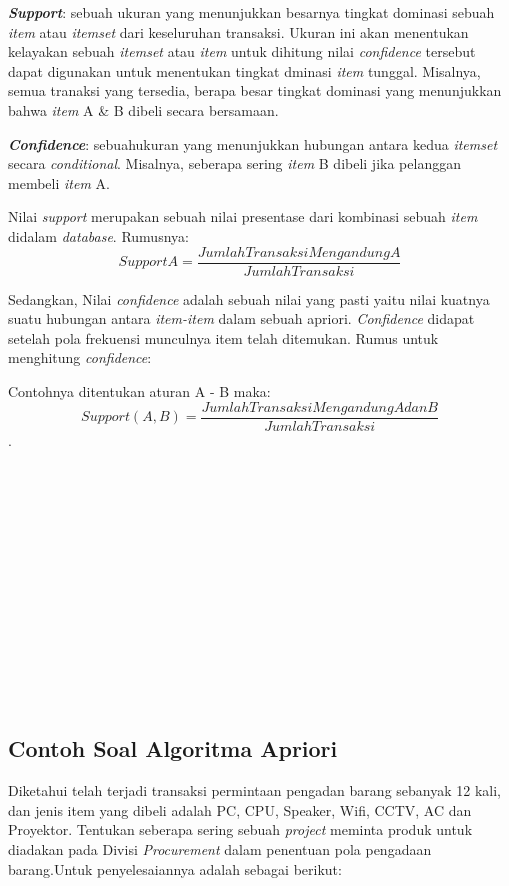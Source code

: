 \par 
\textbf{\textit{Support}}: sebuah ukuran yang menunjukkan besarnya tingkat dominasi sebuah \textit{item} atau \textit{itemset} dari keseluruhan transaksi. Ukuran ini akan menentukan kelayakan sebuah \textit{itemset} atau \textit{item} untuk dihitung nilai \textit{confidence} tersebut dapat digunakan untuk menentukan tingkat dminasi \textit{item} tunggal. Misalnya, semua tranaksi yang tersedia, berapa besar tingkat dominasi yang menunjukkan bahwa \textit{item} A \& B dibeli secara bersamaan.
\par
\textbf{\textit{Confidence}}: sebuahukuran yang menunjukkan hubungan antara kedua \textit{itemset} secara \textit{conditional}. Misalnya, seberapa sering \textit{item} B dibeli jika pelanggan membeli \textit{item} A.

\par
Nilai \textit{support} merupakan sebuah nilai presentase dari kombinasi sebuah \textit{item} didalam \textit{database}.
Rumusnya:
\begin{equation}
    Support A =\frac{Jumlah Transaksi Mengandung A}{Jumlah Transaksi} 
\end{equation}
\par
Sedangkan, Nilai \textit{confidence} adalah sebuah nilai yang pasti yaitu nilai kuatnya suatu hubungan antara \textit{item-item} dalam sebuah apriori. \textit{Confidence} didapat setelah pola frekuensi munculnya item telah ditemukan. Rumus untuk menghitung \textit{confidence}:
\par
Contohnya ditentukan aturan A - B maka:
 \begin{equation}
    Support (A,B) =\frac{Jumlah Transaksi Mengandung A dan B}{Jumlah Transaksi} 
\end{equation}
.
\\
\\
\\
\\
\\
\\
\\
\\
\\
\\
\\
\\
\\
\\
\subsection{Contoh Soal Algoritma Apriori}
Diketahui telah terjadi transaksi permintaan pengadan barang sebanyak 12 kali, dan jenis item yang dibeli adalah PC, CPU, Speaker, Wifi, CCTV, AC dan Proyektor. Tentukan seberapa sering sebuah \textit{project} meminta produk untuk diadakan pada Divisi \textit{Procurement} dalam penentuan pola pengadaan barang.Untuk penyelesaiannya adalah sebagai berikut:

